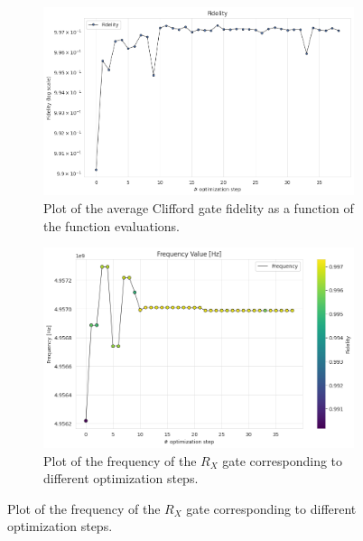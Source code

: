 \begin{figure}[htbp]
    \centering
    \begin{subfigure}[t]{0.45\textwidth}
        \includegraphics[width=\textwidth]{figures/png/RB_optimization/NM/post_ft_true/NM_fid.png}
        \caption{Plot of the average Clifford gate fidelity as a function of the function evaluations.}
        \label{NM_true_fig:fidelity}
    \end{subfigure}
    \hfill
    \begin{subfigure}[t]{0.45\textwidth}
        \includegraphics[width=\textwidth]{figures/png/RB_optimization/NM/post_ft_true/NM_frequency.png}
        \caption{Plot of the frequency of the $R_X$ gate corresponding to different optimization steps.}
        \label{NM_true_fig:frequency}
    \end{subfigure}

    \vspace{0.5cm}


\end{figure}
